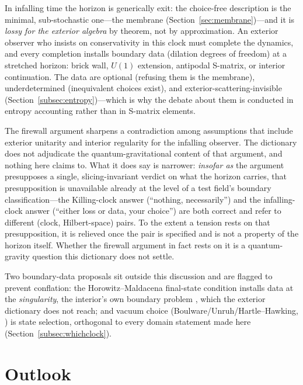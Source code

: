 \documentclass[11pt]{article}
\theoremstyle{definition}
\theoremstyle{remark}
\begin{document}
In infalling time the horizon is generically exit: the choice-free
description is the minimal, sub-stochastic one---the membrane
(Section~\ref{sec:membrane})---and it is \emph{lossy for the exterior
algebra} by theorem, not by approximation. An exterior observer who
insists on conservativity in this clock must complete the dynamics,
and every completion installs boundary data (dilation degrees of
freedom) at a stretched horizon: brick wall, $U(1)$ extension,
antipodal S-matrix, or interior continuation. The data are optional
(refusing them is the membrane), underdetermined (inequivalent
choices exist), and exterior-scattering-invisible
(Section~\ref{subsec:entropy})---which is why the debate about them
is conducted in entropy accounting rather than in S-matrix elements.

The firewall argument \cite{AMPS2013} sharpens a contradiction among
assumptions that include exterior unitarity and interior regularity
for the infalling observer. The dictionary does not adjudicate the
quantum-gravitational content of that argument, and nothing here
claims to. What it does say is narrower: \emph{insofar as} the argument
presupposes a single, slicing-invariant verdict on what the horizon
carries, that presupposition is unavailable already at the level of a
test field's boundary classification---the Killing-clock answer
(``nothing, necessarily'') and the infalling-clock answer (``either
loss or data, your choice'') are both correct and refer to different
(clock, Hilbert-space) pairs. To the extent a tension rests on that
presupposition, it is relieved once the pair is specified and is not a
property of the horizon itself. Whether the firewall argument in fact
rests on it is a quantum-gravity question this dictionary does not
settle.

Two boundary-data proposals sit outside this discussion and are
flagged to prevent conflation: the Horowitz--Maldacena final-state
condition \cite{HorowitzMaldacena} installs data at the
\emph{singularity}, the interior's own boundary problem
\cite{HorowitzMarolf1995}, which the exterior dictionary does not
reach; and vacuum choice (Boulware/Unruh/Hartle--Hawking,
\cite{KayWald1991}) is state selection, orthogonal to every domain
statement made here (Section~\ref{subsec:whichclock}).

\section{Outlook}
\label{sec:outlook}
\end{document}
